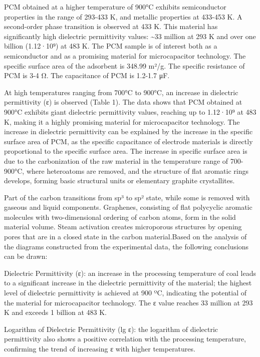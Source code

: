 PCM obtained at a higher temperature of 900°C exhibits semiconductor
properties in the range of 293-433 K, and metallic properties at 433-453
K. A second-order phase transition is observed at 433 K. This material
has significantly high dielectric permittivity values: \textasciitilde33
million at 293 K and over one billion (1.12·10⁹) at 483 K. The PCM
sample is of interest both as a semiconductor and as a promising
material for microcapacitor technology. The specific surface area of the
adsorbent is 348.99 m²/g. The specific resistance of PCM is 3-4 Ω. The
capacitance of PCM is 1.2-1.7 μF.

At high temperatures ranging from 700°C to 900°C, an increase in
dielectric permittivity (ε) is observed (Table 1). The data shows that
PCM obtained at 900°C exhibits giant dielectric permittivity values,
reaching up to 1.12·10⁹ at 483 K, making it a highly promising material
for microcapacitor technology. The increase in dielectric permittivity
can be explained by the increase in the specific surface area of PCM, as
the specific capacitance of electrode materials is directly proportional
to the specific surface area. The increase in specific surface area is
due to the carbonization of the raw material in the temperature range of
700-900°C, where heteroatoms are removed, and the structure of flat
aromatic rings develops, forming basic structural units or elementary
graphite crystallites.

Part of the carbon transitions from sp³ to sp² state, while some is
removed with gaseous and liquid components. Graphenes, consisting of
flat polycyclic aromatic molecules with two-dimensional ordering of
carbon atoms, form in the solid material volume. Steam activation
creates microporous structures by opening pores that are in a closed
state in the carbon material.Based on the analysis of the diagrams
constructed from the experimental data, the following conclusions can be
drawn:

Dielectric Permittivity (ε): an increase in the processing temperature
of coal leads to a significant increase in the dielectric permittivity
of the material; the highest level of dielectric permittivity is
achieved at 900 ºC, indicating the potential of the material for
microcapacitor technology. The ε value reaches 33 million at 293 K and
exceeds 1 billion at 483 K.

Logarithm of Dielectric Permittivity (lg ε): the logarithm of dielectric
permittivity also shows a positive correlation with the processing
temperature, confirming the trend of increasing ε with higher
temperatures.

